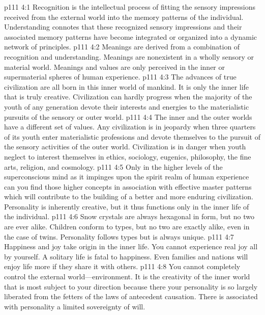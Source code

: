 %
\vs p111 4:1 Recognition is the intellectual process of fitting the sensory impressions received from the external world into the memory patterns of the individual. Understanding connotes that these recognized sensory impressions and their associated memory patterns have become integrated or organized into a dynamic network of principles.
\vs p111 4:2 Meanings are derived from a combination of recognition and understanding. Meanings are nonexistent in a wholly sensory or material world. Meanings and values are only perceived in the inner or supermaterial spheres of human experience.
\pc \vs p111 4:3 The advances of true civilization are all born in this inner world of mankind. It is only the inner life that is truly creative. Civilization can hardly progress when the majority of the youth of any generation devote their interests and energies to the materialistic pursuits of the sensory or outer world.
\vs p111 4:4 The inner and the outer worlds have a different set of values. Any civilization is in jeopardy when three quarters of its youth enter materialistic professions and devote themselves to the pursuit of the sensory activities of the outer world. Civilization is in danger when youth neglect to interest themselves in ethics, sociology, eugenics, philosophy, the fine arts, religion, and cosmology.
\vs p111 4:5 Only in the higher levels of the superconscious mind as it impinges upon the spirit realm of human experience can you find those higher concepts in association with effective master patterns which will contribute to the building of a better and more enduring civilization. Personality is inherently creative, but it thus functions only in the inner life of the individual.
\pc \vs p111 4:6 Snow crystals are always hexagonal in form, but no two are ever alike. Children conform to types, but no two are exactly alike, even in the case of twins. Personality follows types but is always unique.
\pc \vs p111 4:7 Happiness and joy take origin in the inner life. You cannot experience real joy all by yourself. A solitary life is fatal to happiness. Even families and nations will enjoy life more if they share it with others.
\pc \vs p111 4:8 You cannot completely control the external world---environment. It is the creativity of the inner world that is most subject to your direction because there your personality is so largely liberated from the fetters of the laws of antecedent causation. There is associated with personality a limited sovereignty of will.
